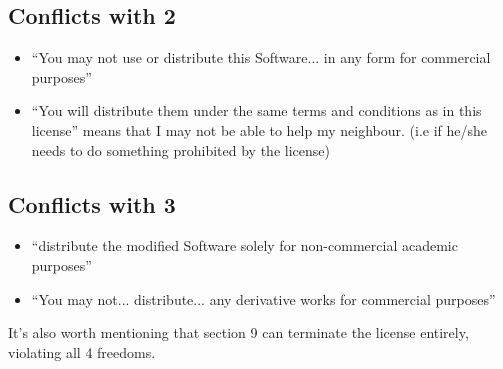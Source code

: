 \documentclass[a4paper, 6pt]{article}
\begin{document}
\subsection{Conflicts with 2}
\begin{itemize}
  \item ``You may not use or distribute this Software... in any form for commercial purposes''
  \item  ``You will distribute them under the same terms and conditions as in this license'' means that I may not be able to help my neighbour. (i.e if he/she needs to do something prohibited by the license)
\end{itemize}
\subsection{Conflicts with 3}
\begin{itemize}
  \item  ``distribute the modified Software solely for non-commercial academic purposes''
  \item  ``You may not... distribute... any derivative works for commercial purposes''
\end{itemize}

It's also worth mentioning that section 9 can terminate the license entirely, violating all 4 freedoms.
\end{document}
